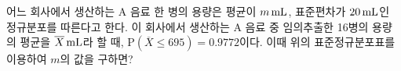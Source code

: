 \noindent\begin{minipage}[t]{0.58\linewidth}\vspace{0pt}\raggedright 어느 회사에서 생산하는 A 음료 한 병의 용량은 평균이 $m\mkern3mu \mathrm{mL}$, 표준편차가 $20\mkern3mu \mathrm{mL}$인 정규분포를 따른다고 한다. 이 회사에서 생산하는 A 음료 중 임의추출한 16병의 용량의 평균을 $\overline{X}\mkern3mu \mathrm{mL}$라 할 때, $\mathrm{P}(\overline{X}\le 695)=0.9772$이다. 이때 위의 표준정규분포표를 이용하여 $m$의 값을 구하면?\end{minipage}\hfill\begin{minipage}[t]{0.4\linewidth}\vspace{0pt}\centering \resizebox{\ifdim\width>\linewidth\linewidth\else\width\fi}{!}{}\end{minipage}\par
{}
